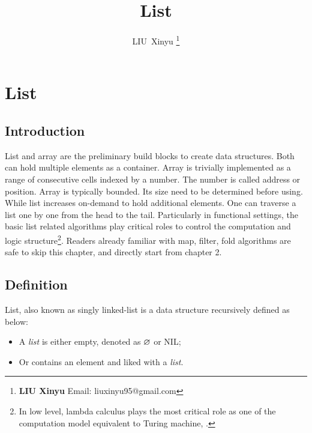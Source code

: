 \documentclass[b5paper]{article}
\begin{document}
\title{List}

\author{LIU~Xinyu
\thanks{{\bfseries LIU Xinyu } \newline
  Email: liuxinyu95@gmail.com \newline}
  }

\maketitle
\fi


\ifx\wholebook\relax
\chapter{List}
\fi

\section{Introduction}
\label{introduction}

List and array are the preliminary build blocks to create data structures. Both can hold multiple elements as a container. Array is trivially implemented as a range of consecutive cells indexed by a number. The number is called address or position. Array is typically bounded. Its size need to be determined before using. While list increases on-demand to hold additional elements. One can traverse a list one by one from the head to the tail. Particularly in functional settings, the basic list related algorithms play critical roles to control the computation and logic structure\footnote{In low level, lambda calculus plays the most critical role as one of the computation model equivalent to Turing machine\cite{mittype}, \cite{unplugged}.}. Readers already familiar with map, filter, fold algorithms are safe to skip this chapter, and directly start from chapter 2.

\section{Definition}

List, also known as singly linked-list is a data structure recursively defined as below:

\begin{itemize}
\item A {\em list} is either empty, denoted as $\varnothing$ or NIL;
\item Or contains an element and liked with a {\em list}.
\end{itemize}
\end{document}
